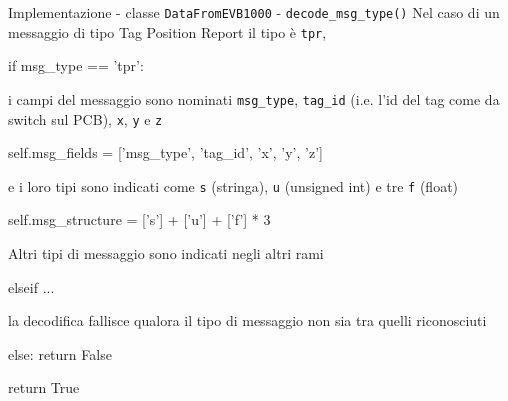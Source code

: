 
\begin{frame}[fragile, shrink=30]{Implementazione - classe \lstinline!DataFromEVB1000! - \lstinline!decode_msg_type()!}
  Nel caso di un messaggio di tipo Tag Position Report il tipo è \lstinline!tpr!,
  
  \begin{Python}
        if msg_type == 'tpr':
  \end{Python}
  
  i campi del messaggio sono nominati \lstinline!msg_type!, \lstinline!tag_id! (i.e. l'id
  del tag come da switch sul PCB), \lstinline!x!, \lstinline!y! e \lstinline!z!
  \begin{Python}
            self.msg_fields = ['msg_type', 'tag_id', 'x', 'y', 'z']
  \end{Python}
  e i loro tipi sono indicati come \lstinline!s! (stringa), \lstinline!u! (unsigned int)
  e tre \lstinline!f! (float)
  \begin{Python}
            self.msg_structure = ['s'] + ['u'] + ['f'] * 3
  \end{Python}
  Altri tipi di messaggio sono indicati negli altri rami
  \begin{Python}
        elseif ...
  \end{Python}
  la decodifica fallisce qualora il tipo di messaggio non sia tra quelli riconosciuti
  \begin{Python}
        else:
            return False

        return True
  \end{Python}
\end{frame}

